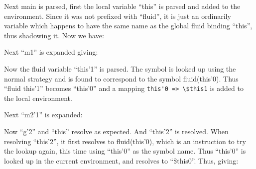 \documentclass[12pt,english,letterpaper]{article}
\begin{document}
Next main is parsed, first the local variable ``this'' is parsed and
added to the environment.  Since it was not prefixed with ``fluid'',
it is just an ordinarily variable which happens to have the same name as
the global fluid binding ``this'', thus shadowing it.  Now we have:


Next ``m1'' is expanded giving:


Now the fluid variable ``this'1'' is parsed.  The symbol is looked up
using the normal strategy and is found to correspond to the symbol
fluid(this'0).  Thus ``fluid this'1'' becomes ``this'0'' and a mapping
\verb/this'0 => \$this1/ is added to the local environment.


Next ``m2'1'' is expanded:


Now ``g'2'' and ``this'' resolve as expected.  And ``this'2'' is
resolved.  When resolving ``this'2'', it first resolves to
fluid(this'0), which is an instruction to try the lookup again, this
time using ``this'0'' as the symbol name.  Thus ``this'0'' is looked
up in the current environment, and resolves to ``\$this0''. Thus,
giving:

\end{document}
